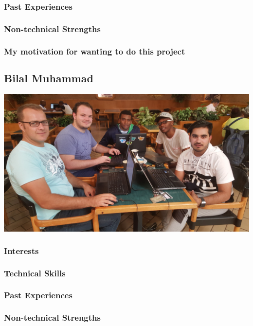 \documentclass[a4paper,12pt]{article}
\begin{document}
			\subsubsection{Past Experiences}
			
			\subsubsection{Non-technical Strengths}
			
			\subsubsection{My motivation for wanting to do this project}
		
		\newpage
		\subsection{Bilal Muhammad}
		\includegraphics[width=1\textwidth]{./Pictures/the_group.jpg}\\
			\subsubsection{Interests}
			
			\subsubsection{Technical Skills}
			
			\subsubsection{Past Experiences}
			
			\subsubsection{Non-technical Strengths}
			
\end{document}
